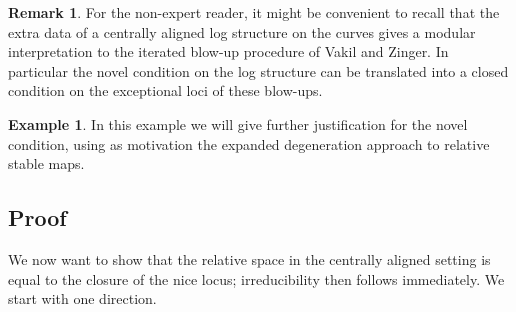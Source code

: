 \documentclass[11pt]{amsart}
\theoremstyle{definition}
\theoremstyle{definition}
\newtheorem{example}[thm]{Example}
\newtheorem{remark}[thm]{Remark}
\begin{document}
\begin{remark}
 For the non-expert reader, it might be convenient to recall that the extra data of a centrally aligned log structure on the curves gives a modular interpretation to the iterated blow-up procedure of Vakil and Zinger. In particular the novel condition on the log structure can be translated into a closed condition on the exceptional loci of these blow-ups. 
\end{remark}


\begin{example} In this example we will give further justification for the novel condition, using as motivation the expanded degeneration approach to relative stable maps.

\end{example}

\subsection{Proof}
We now want to show that the relative space in the centrally aligned setting is equal to the closure of the nice locus; irreducibility then follows immediately. We start with one direction.
\end{document}
